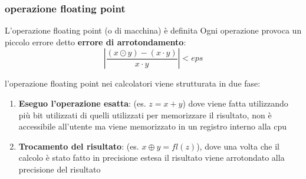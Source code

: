 \subsubsection{operazione floating point} 
L'operazione floating point (o di macchina) è definita
Ogni operazione provoca un piccolo errore detto \textbf{errore di arrotondamento}:
\[
    |\frac{(x\odot y)-(x\cdot y)}{x\cdot y}|<eps
\]

l'operazione floating point nei calcolatori viene strutturata in due fase:
\begin{enumerate}
    \item \textbf{Eseguo l'operazione esatta}: (es. $z=x+y$) dove viene fatta utilizzando più bit utilizzati di quelli utilizzati per memorizzare il risultato, non è accessibile all'utente ma viene memorizzato in un registro interno alla cpu
    \item \textbf{Trocamento del risultato}: (es. $x\oplus y = fl(z)$), dove una volta che il calcolo è stato fatto in precisione estesa il risultato viene arrotondato alla precisione del risultato
\end{enumerate}
